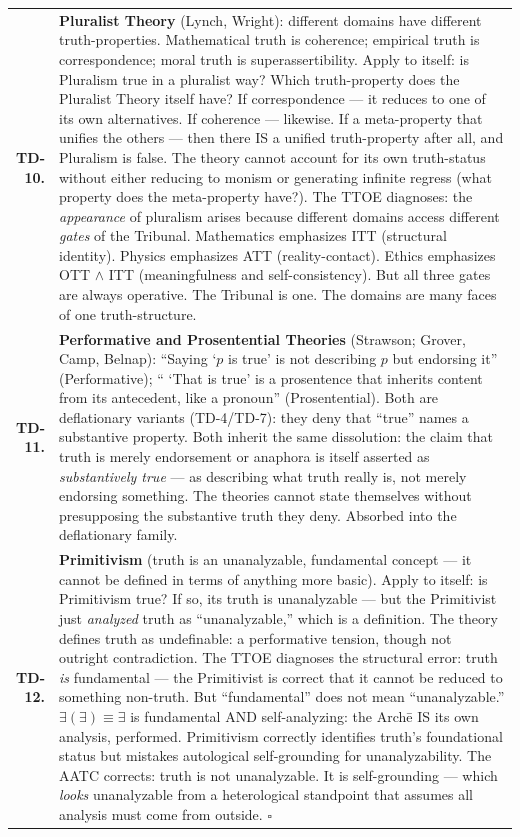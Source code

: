 \documentclass[10pt, openany, oneside]{book}
\renewcommand{\footnotesize}{\fontsize{8.5}{11}\selectfont}
\begin{document}
{\footnotesize
\noindent\begin{tabular}{r p{}}
\textbf{TD-10.} & \textbf{Pluralist Theory} (Lynch, Wright): different domains have different truth-properties. Mathematical truth is coherence; empirical truth is correspondence; moral truth is superassertibility. Apply to itself: is Pluralism true in a pluralist way? Which truth-property does the Pluralist Theory itself have? If correspondence --- it reduces to one of its own alternatives. If coherence --- likewise. If a meta-property that unifies the others --- then there IS a unified truth-property after all, and Pluralism is false. The theory cannot account for its own truth-status without either reducing to monism or generating infinite regress (what property does the meta-property have?). The TTOE diagnoses: the \textit{appearance} of pluralism arises because different domains access different \textit{gates} of the Tribunal. Mathematics emphasizes ITT (structural identity). Physics emphasizes ATT (reality-contact). Ethics emphasizes OTT $\wedge$ ITT (meaningfulness and self-consistency). But all three gates are always operative. The Tribunal is one. The domains are many faces of one truth-structure. \\[0.3em]
\textbf{TD-11.} & \textbf{Performative and Prosentential Theories} (Strawson; Grover, Camp, Belnap): ``Saying `$p$ is true' is not describing $p$ but endorsing it'' (Performative); `` `That is true' is a prosentence that inherits content from its antecedent, like a pronoun'' (Prosentential). Both are deflationary variants (TD-4/TD-7): they deny that ``true'' names a substantive property. Both inherit the same dissolution: the claim that truth is merely endorsement or anaphora is itself asserted as \textit{substantively true} --- as describing what truth really is, not merely endorsing something. The theories cannot state themselves without presupposing the substantive truth they deny. Absorbed into the deflationary family. \\[0.3em]
\textbf{TD-12.} & \textbf{Primitivism} (truth is an unanalyzable, fundamental concept --- it cannot be defined in terms of anything more basic). Apply to itself: is Primitivism true? If so, its truth is unanalyzable --- but the Primitivist just \textit{analyzed} truth as ``unanalyzable,'' which is a definition. The theory defines truth as undefinable: a performative tension, though not outright contradiction. The TTOE diagnoses the structural error: truth \textit{is} fundamental --- the Primitivist is correct that it cannot be reduced to something non-truth. But ``fundamental'' does not mean ``unanalyzable.'' $\exists(\exists) \equiv \exists$ is fundamental AND self-analyzing: the Arch\={e} IS its own analysis, performed. Primitivism correctly identifies truth's foundational status but mistakes autological self-grounding for unanalyzability. The AATC corrects: truth is not unanalyzable. It is self-grounding --- which \textit{looks} unanalyzable from a heterological standpoint that assumes all analysis must come from outside. $\square$ \\[0.3em]
\end{tabular}
}
\end{document}
